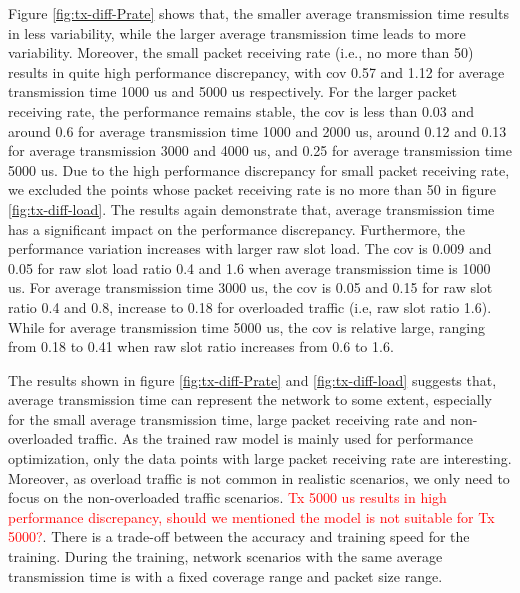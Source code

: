 Figure \ref{fig:tx-diff-Prate} shows that, the smaller average transmission time results in less variability, while the larger average transmission time leads to more variability. Moreover, the small packet receiving rate (i.e., no more than 50) results in quite high performance discrepancy, with \gls{cov} 0.57 and 1.12 for average transmission time 1000 us and 5000 us respectively. For the larger packet receiving rate, the performance remains stable, the \gls{cov} is less than 0.03 and around 0.6 for average transmission time 1000 and 2000 us, around 0.12 and 0.13 for average transmission 3000 and 4000 us, and 0.25 for average transmission time 5000 us. Due to the high performance discrepancy for small packet receiving rate, we excluded the points whose packet receiving rate is no more than 50 in figure \ref{fig:tx-diff-load}.
The results again demonstrate that, average transmission time has a significant impact on the performance discrepancy. Furthermore, the performance variation increases with larger \gls{raw} slot load. The \gls{cov} is 0.009 and 0.05 for \gls{raw} slot load ratio 0.4 and 1.6 when average transmission time is 1000 us. For average transmission time 3000 us, the \gls{cov} is 0.05 and 0.15 for \gls{raw} slot ratio 0.4 and 0.8, increase to 0.18 for overloaded traffic (i.e, \gls{raw} slot ratio 1.6).  While for average transmission time 5000 us, the \gls{cov} is relative large, ranging from 0.18 to 0.41 when \gls{raw} slot ratio increases from 0.6 to 1.6.



 The results shown in figure \ref{fig:tx-diff-Prate} and  \ref{fig:tx-diff-load}  suggests that, average transmission time can represent the network to some extent, especially for the small average transmission time, large packet receiving rate and non-overloaded traffic. As the trained \gls{raw} model is mainly used for performance optimization, only the data points with large packet receiving rate are interesting.
 Moreover, as overload traffic is not common in realistic scenarios, we only need to focus on the non-overloaded traffic scenarios. \textcolor{red}{Tx 5000 us results in high performance discrepancy, should we mentioned the model is not suitable for Tx 5000?}. 
 There is a trade-off between the accuracy and training speed for the training. During the training, network scenarios with the same average transmission time is with a fixed coverage range and packet size range. 



